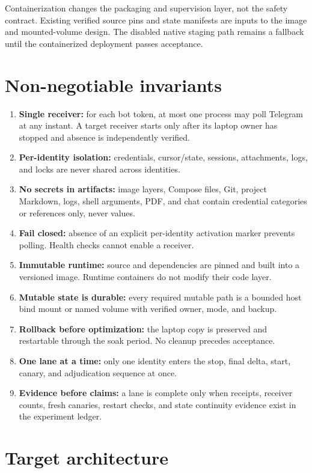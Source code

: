 \documentclass[11pt]{article}
\begin{document}
Containerization changes the packaging and supervision layer, not the safety
contract. Existing verified source pins and state manifests are inputs to the
image and mounted-volume design. The disabled native staging path remains a
fallback until the containerized deployment passes acceptance.

\section{Non-negotiable invariants}

\begin{enumerate}
\item \textbf{Single receiver:} for each bot token, at most one process may poll
Telegram at any instant. A target receiver starts only after its laptop owner
has stopped and absence is independently verified.
\item \textbf{Per-identity isolation:} credentials, cursor/state, sessions,
attachments, logs, and locks are never shared across identities.
\item \textbf{No secrets in artifacts:} image layers, Compose files, Git,
project Markdown, logs, shell arguments, PDF, and chat contain credential
categories or references only, never values.
\item \textbf{Fail closed:} absence of an explicit per-identity activation
marker prevents polling. Health checks cannot enable a receiver.
\item \textbf{Immutable runtime:} source and dependencies are pinned and built
into a versioned image. Runtime containers do not modify their code layer.
\item \textbf{Mutable state is durable:} every required mutable path is a
bounded host bind mount or named volume with verified owner, mode, and backup.
\item \textbf{Rollback before optimization:} the laptop copy is preserved and
restartable through the soak period. No cleanup precedes acceptance.
\item \textbf{One lane at a time:} only one identity enters the stop, final
delta, start, canary, and adjudication sequence at once.
\item \textbf{Evidence before claims:} a lane is complete only when receipts,
receiver counts, fresh canaries, restart checks, and state continuity evidence
exist in the experiment ledger.
\end{enumerate}

\section{Target architecture}
\end{document}
